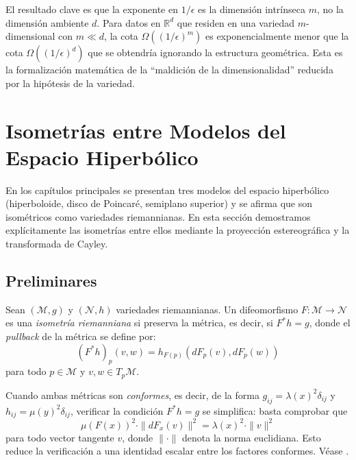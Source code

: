 \begin{remark}\label{rem:complejidad_intrinseca}
El resultado clave es que la exponente en $1/\epsilon$ es la dimensión intrínseca $m$, no la dimensión ambiente $d$. Para datos en $\mathbb{R}^d$ que residen en una variedad $m$-dimensional con $m \ll d$, la cota $\Omega((1/\epsilon)^m)$ es exponencialmente menor que la cota $\Omega((1/\epsilon)^d)$ que se obtendría ignorando la estructura geométrica. Esta es la formalización matemática de la ``maldición de la dimensionalidad'' reducida por la hipótesis de la variedad.
\end{remark}

\section{Isometrías entre Modelos del Espacio Hiperbólico}\label{sec:isometrias_hiperbolico}

En los capítulos principales se presentan tres modelos del espacio hiperbólico (hiperboloide, disco de Poincaré, semiplano superior) y se afirma que son isométricos como variedades riemannianas. En esta sección demostramos explícitamente las isometrías entre ellos mediante la proyección estereográfica y la transformada de Cayley.

\subsection{Preliminares}\label{subsec:isometrias_preliminares}

\begin{definition}\label{def:isometria_riemanniana}
Sean $(\mathcal{M}, g)$ y $(\mathcal{N}, h)$ variedades riemannianas. Un difeomorfismo $F: \mathcal{M} \to \mathcal{N}$ es una \textit{isometría riemanniana} si preserva la métrica, es decir, si $F^*h = g$, donde el \textit{pullback} de la métrica se define por:
\begin{equation}\label{eq:pullback_metrica}
(F^*h)_p(v, w) = h_{F(p)}(dF_p(v), dF_p(w))
\end{equation}
para todo $p \in \mathcal{M}$ y $v, w \in T_p\mathcal{M}$.
\end{definition}

\begin{remark}\label{rem:isometria_conforme}
Cuando ambas métricas son \textit{conformes}, es decir, de la forma $g_{ij} = \lambda(x)^2 \delta_{ij}$ y $h_{ij} = \mu(y)^2 \delta_{ij}$, verificar la condición $F^*h = g$ se simplifica: basta comprobar que
\[
\mu(F(x))^2 \cdot \|dF_x(v)\|^2 = \lambda(x)^2 \cdot \|v\|^2
\]
para todo vector tangente $v$, donde $\|\cdot\|$ denota la norma euclidiana. Esto reduce la verificación a una identidad escalar entre los factores conformes. Véase \citet[Capítulo~3]{lee2018introduction}.
\end{remark}

